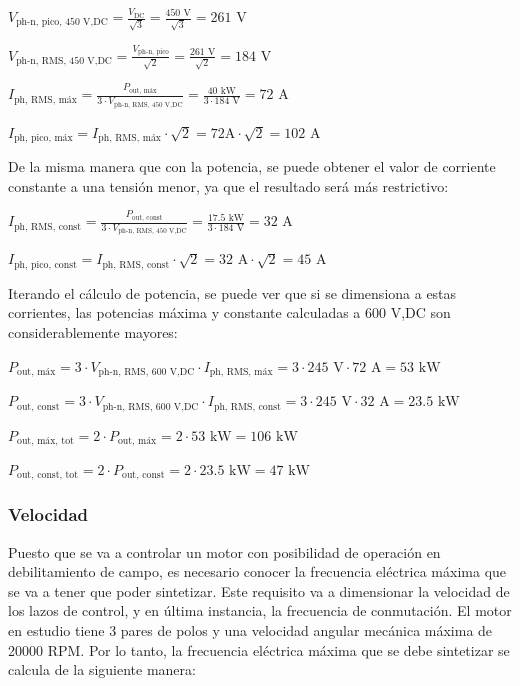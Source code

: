 \(V_{\text{ph-n, pico, 450 V,DC}} = \frac{V_{\text{DC}}}{\sqrt{3}} = \frac{450 \text{ V}}{\sqrt{3}} = 261 \text{ V}\)

\(V_{\text{ph-n, RMS, 450 V,DC}} = \frac{V_{\text{ph-n, pico}}}{\sqrt{2}} = \frac{261 \text{ V}}{\sqrt{2}} = 184 \text{ V}\)


\(I_{\text{ph, RMS, máx}} = \frac{P_{\text{out, máx}}}{3\cdot V_{\text{ph-n, RMS, 450 V,DC}}} = \frac{40 \text{ kW}}{3\cdot184 \text{ V}} = 72 \text{ A}\)

\(I_{\text{ph, pico, máx}} = I_{\text{ph, RMS, máx}}\cdot\sqrt{2} = 72\text{A} \cdot\sqrt{2} = 102 \text{ A}\)

De la misma manera que con la potencia, se puede obtener el valor de corriente constante a una tensión menor, ya que el resultado será más restrictivo:

\(I_{\text{ph, RMS, const}} = \frac{P_{\text{out, const}}}{3\cdot V_{\text{ph-n, RMS, 450 V,DC}}} = \frac{17.5 \text{ kW}}{3\cdot184 \text{ V}} = 32 \text{ A}\)

\(I_{\text{ph, pico, const}} = I_{\text{ph, RMS, const}}\cdot\sqrt{2} = 32 \text{ A}\cdot\sqrt{2} = 45 \text{ A}\)


Iterando el cálculo de potencia, se puede ver que si se dimensiona a estas corrientes, las potencias máxima y constante calculadas a 600 V,DC son considerablemente mayores:

\(P_{\text{out, máx}} = 3\cdot V_{\text{ph-n, RMS, 600 V,DC}}\cdot I_{\text{ph, RMS, máx}} = 3\cdot245 \text{ V}\cdot 72 \text{ A} = 53 \text{ kW}\)

\(P_{\text{out, const}} = 3\cdot V_{\text{ph-n, RMS, 600 V,DC}}\cdot I_{\text{ph, RMS, const}} = 3\cdot245 \text{ V}\cdot 32 \text{ A} = 23.5 \text{ kW}\)

\(P_{\text{out, máx, tot}} = 2\cdot P_{\text{out, máx}} = 2\cdot53 \text{ kW} = 106 \text{ kW}\)

\(P_{\text{out, const, tot}} = 2\cdot P_{\text{out, const}} = 2\cdot23.5 \text{ kW} = 47 \text{ kW}\)


\subsubsection{Velocidad}
Puesto que se va a controlar un motor con posibilidad de operación en debilitamiento de campo, es necesario conocer la frecuencia eléctrica máxima que se va a tener que poder sintetizar. Este requisito va a dimensionar la velocidad de los lazos de control, y en última instancia, la frecuencia de conmutación. El motor en estudio tiene 3 pares de polos y una velocidad angular mecánica máxima de 20000 RPM. Por lo tanto, la frecuencia eléctrica máxima que se debe sintetizar se calcula de la siguiente manera:


